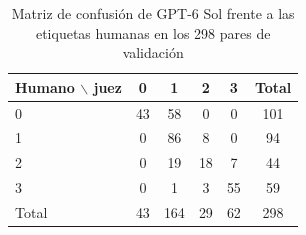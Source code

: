 \begin{table}[htbp!]
    \centering
    \caption{Matriz de confusión de GPT-6 Sol frente a las etiquetas humanas en los 298 pares de validación}
    \label{tab:res-kappa-val}
    \begin{tabular}{|l|c|c|c|c|c|}
        \hline
        \textbf{Humano $\backslash$ juez} & \textbf{0} & \textbf{1} & \textbf{2} & \textbf{3} & \textbf{Total} \\
        \hline
        0 & 43 & 58 & 0 & 0 & 101 \\
        \hline
        1 & 0 & 86 & 8 & 0 & 94 \\
        \hline
        2 & 0 & 19 & 18 & 7 & 44 \\
        \hline
        3 & 0 & 1 & 3 & 55 & 59 \\
        \hline
        Total & 43 & 164 & 29 & 62 & 298 \\
        \hline
    \end{tabular}
\end{table}
